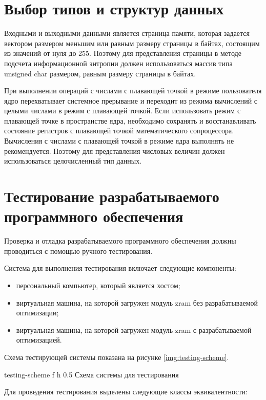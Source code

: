 \section{Выбор типов и структур данных}

Входными и выходными данными является страница памяти, которая задается вектором размером меньшим или равным размеру страницы в байтах, состоящим из значений от нуля до 255. Поэтому для представления страницы в методе подсчета информационной энтропии должен использоваться массив типа unsigned char размером, равным размеру страницы в байтах.

При выполнении операций с числами с плавающей точкой в режиме пользователя ядро перехватывает системное прерывание и переходит из режима вычислений с целыми числами в режим с плавающей точкой. Если использовать режим с плавающей точке в пространстве ядра, необходимо сохранять и восстанавливать состояние регистров с плавающей точкой математического сопроцессора. Вычисления с числами с плавающей точкой в режиме ядра выполнять не рекомендуется. Поэтому для представления числовых величин должен использоваться целочисленный тип данных. 

\section{Тестирование разрабатываемого программного обеспечения}

Проверка и отладка разрабатываемого программного обеспечения должны проводиться с помощью ручного тестирования.

Система для выполнения тестирования включает следующие компоненты:

\begin{itemize}
	\item персональный компьютер, который является хостом;
	\item виртуальная машина, на которой загружен модуль zram без разрабатываемой оптимизации;
	\item виртуальная машина, на которой загружен модуль zram с разрабатываемой оптимизацией.
\end{itemize}

Схема тестирующей системы показана на рисунке \ref{img:testing-scheme}.

    {testing-scheme}
    {f}
    {h}
    {0.5\textwidth}
    {Схема системы для тестирования}

Для проведения тестирования выделены следующие классы эквивалентности:

